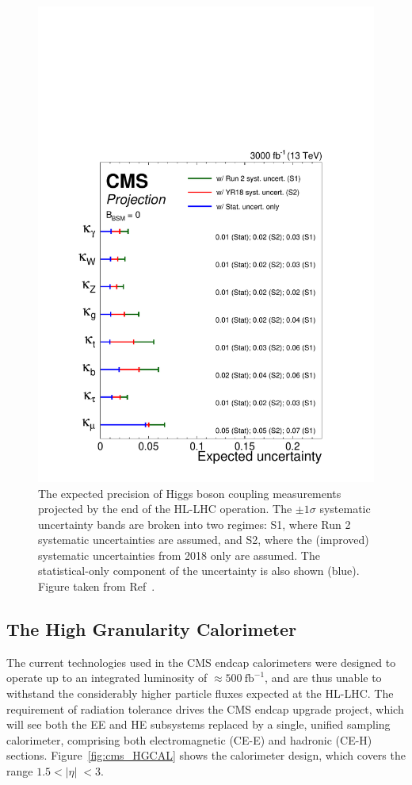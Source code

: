 \begin{figure}[htbp!]
\centering
\includegraphics[width =0.7\linewidth]{Figures/Detector/HGCAL/Misc/high_lumi_higgs_couplings.pdf}\hfill
\caption[The expected precision of Higgs boson coupling measurements at the HL-LHC.]{The expected precision of Higgs boson coupling measurements projected by the end of the HL-LHC operation. The $\pm 1\sigma$ systematic uncertainty bands are broken into two regimes: S1, where Run 2 systematic uncertainties are assumed, and S2, where the (improved) systematic uncertainties from 2018 only are assumed. The statistical-only component of the uncertainty is also shown (blue). Figure taken from Ref~\cite{FTR_HLLHC_Kappa}.}
\label{fig:cms_high_lumi_couplings}
\end{figure}


\subsection{The High Granularity Calorimeter}

The current technologies used in the CMS endcap calorimeters were designed to operate up to an integrated luminosity of ${\approx}500~\mathrm{fb}^{-1}$, and are thus unable to withstand the considerably higher particle fluxes expected at the HL-LHC. The requirement of radiation tolerance drives the CMS endcap upgrade project, which will see both the EE and HE subsystems replaced by a single, unified sampling calorimeter, comprising both electromagnetic (CE-E) and hadronic (CE-H) sections. Figure~\ref{fig:cms_HGCAL} shows the calorimeter design, which covers the range $1.5<|\eta|\;<3$. 


